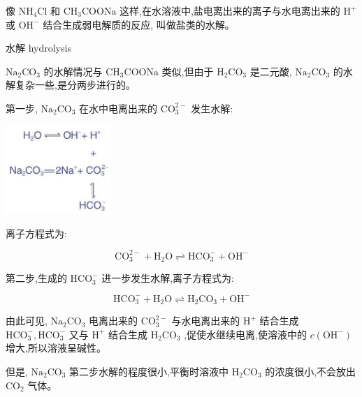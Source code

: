 \documentclass[10pt]{article}
\begin{document}
像 \({\mathrm{{NH}}}_{4}\mathrm{{Cl}}\) 和 \({\mathrm{{CH}}}_{3}\mathrm{{COONa}}\) 这样,在水溶液中,盐电离出来的离子与水电离出来的 \({\mathrm{H}}^{ + }\) 或 \({\mathrm{{OH}}}^{ - }\) 结合生成弱电解质的反应, 叫做盐类的水解。

\begin{mdframed}

水解 hydrolysis

\end{mdframed}

\({\mathrm{{Na}}}_{2}{\mathrm{{CO}}}_{3}\) 的水解情况与 \({\mathrm{{CH}}}_{3}\mathrm{{COONa}}\) 类似,但由于 \({\mathrm{H}}_{2}{\mathrm{{CO}}}_{3}\) 是二元酸, \({\mathrm{{Na}}}_{2}{\mathrm{{CO}}}_{3}\) 的水解复杂一些,是分两步进行的。

第一步, \({\mathrm{{Na}}}_{2}{\mathrm{{CO}}}_{3}\) 在水中电离出来的 \({\mathrm{{CO}}}_{3}^{2 - }\) 发生水解:

\begin{center}
\includegraphics[max width=0.3\textwidth]{images/0190da9d-8bfd-732f-bc2c-0b21d0f13b91_78_888290.jpg}
\end{center}

离子方程式为:

\[
{\mathrm{{CO}}}_{3}^{2 - } + {\mathrm{H}}_{2}\mathrm{O} \rightleftharpoons {\mathrm{{HCO}}}_{3}^{ - } + {\mathrm{{OH}}}^{ - }
\]

第二步,生成的 \({\mathrm{{HCO}}}_{3}^{ - }\) 进一步发生水解,离子方程式为:

\[
{\mathrm{{HCO}}}_{3}^{ - } + {\mathrm{H}}_{2}\mathrm{O} \rightleftharpoons {\mathrm{H}}_{2}{\mathrm{{CO}}}_{3} + {\mathrm{{OH}}}^{ - }
\]

由此可见, \({\mathrm{{Na}}}_{2}{\mathrm{{CO}}}_{3}\) 电离出来的 \({\mathrm{{CO}}}_{3}^{2 - }\) 与水电离出来的 \({\mathrm{H}}^{ + }\) 结合生成 \({\mathrm{{HCO}}}_{3}^{ - },{\mathrm{{HCO}}}_{3}^{ - }\) 又与 \({\mathrm{H}}^{ + }\) 结合生成 \({\mathrm{H}}_{2}{\mathrm{{CO}}}_{3}\) ,促使水继续电离,使溶液中的 \(c\left( {\mathrm{{OH}}}^{ - }\right)\) 增大,所以溶液呈碱性。

但是, \({\mathrm{{Na}}}_{2}{\mathrm{{CO}}}_{3}\) 第二步水解的程度很小,平衡时溶液中 \({\mathrm{H}}_{2}{\mathrm{{CO}}}_{3}\) 的浓度很小,不会放出 \({\mathrm{{CO}}}_{2}\) 气体。
\end{document}
